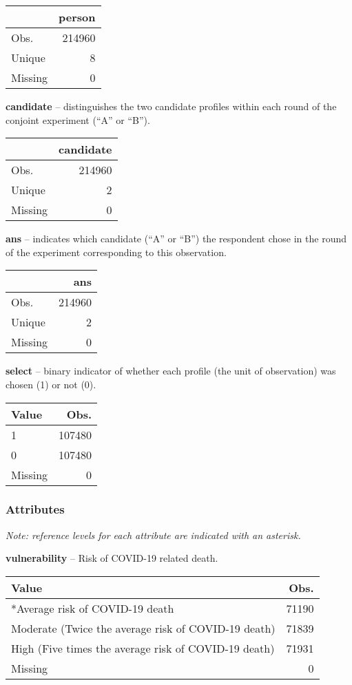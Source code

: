 \documentclass[
]{article}
\begin{document}
\begin{longtable}[]{@{}lr@{}}
\toprule
& person\tabularnewline
\midrule
\endhead
Obs. & 214960\tabularnewline
Unique & 8\tabularnewline
Missing & 0\tabularnewline
\bottomrule
\end{longtable}

\textbf{candidate} -- distinguishes the two candidate profiles within
each round of the conjoint experiment (``A'' or ``B'').

\begin{longtable}[]{@{}lr@{}}
\toprule
& candidate\tabularnewline
\midrule
\endhead
Obs. & 214960\tabularnewline
Unique & 2\tabularnewline
Missing & 0\tabularnewline
\bottomrule
\end{longtable}

\textbf{ans} -- indicates which candidate (``A'' or ``B'') the
respondent chose in the round of the experiment corresponding to this
observation.

\begin{longtable}[]{@{}lr@{}}
\toprule
& ans\tabularnewline
\midrule
\endhead
Obs. & 214960\tabularnewline
Unique & 2\tabularnewline
Missing & 0\tabularnewline
\bottomrule
\end{longtable}

\textbf{select} -- binary indicator of whether each profile (the unit of
observation) was chosen (1) or not (0).

\begin{longtable}[]{@{}lr@{}}
\toprule
Value & Obs.\tabularnewline
\midrule
\endhead
1 & 107480\tabularnewline
0 & 107480\tabularnewline
Missing & 0\tabularnewline
\bottomrule
\end{longtable}

\newpage

\hypertarget{attributes}{%
\subsubsection{Attributes}\label{attributes}}

\emph{Note: reference levels for each attribute are indicated with an
asterisk.}

\textbf{vulnerability} -- Risk of COVID-19 related death.

\begin{longtable}[]{@{}lr@{}}
\toprule
Value & Obs.\tabularnewline
\midrule
\endhead
*Average risk of COVID-19 death & 71190\tabularnewline
Moderate (Twice the average risk of COVID-19 death) &
71839\tabularnewline
High (Five times the average risk of COVID-19 death) &
71931\tabularnewline
Missing & 0\tabularnewline
\bottomrule
\end{longtable}
\end{document}

